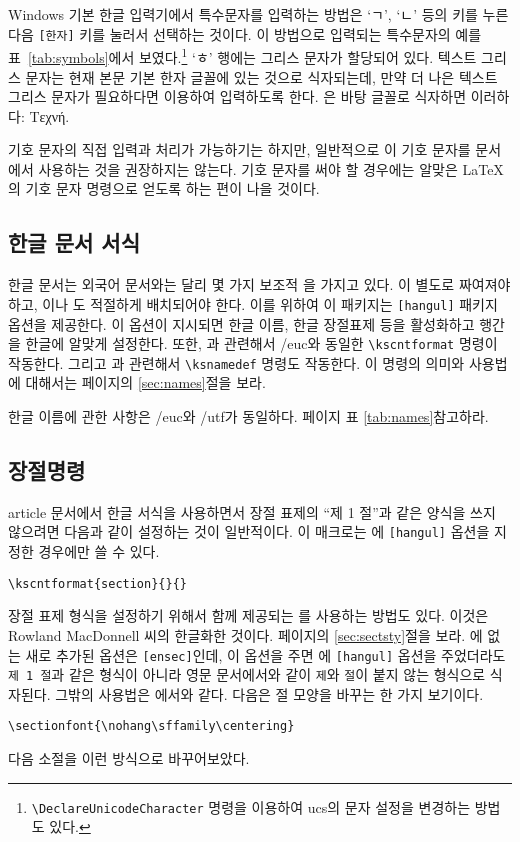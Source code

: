 Windows 기본 한글 입력기에서 특수문자를 입력하는 방법은 `ㄱ', `ㄴ' 등의 키를
누른 다음 \texttt{[한자]} 키를 눌러서 선택하는 것이다. 이 방법으로 입력되는
특수문자의 예를 표~\ref{tab:symbols}에서 보였다.\footnote{%
	\texttt{\textbackslash DeclareUnicodeCharacter} 명령을 이용하여
	ucs의 문자 설정을 변경하는 방법도 있다.}
`ㅎ' 행에는 그리스 문자가 할당되어 있다. 텍스트 그리스 문자는
현재 본문 기본 한자 글꼴에 있는 것으로 식자되는데, 만약 더 나은
텍스트 그리스 문자가 필요하다면 \을 이용하여 입력하도록 한다.	
은 바탕 글꼴로 식자하면 이러하다: Τεχνή.

기호 문자의 직접 입력과 처리가 가능하기는 하지만, 일반적으로
이 기호 문자를 문서에서 사용하는 것을 권장하지는 않는다.
기호 문자를 써야 할 경우에는 알맞은 \LaTeX 의 기호 문자 명령으로
얻도록 하는 편이 나을 것이다.

\subsection{한글 문서 서식}
한글 문서는 외국어 문서와는 달리 몇 가지 보조적 을
가지고 있다. 이 별도로 짜여져야 하고, 이나
도 적절하게 배치되어야 한다.
이를 위하여 이 패키지는 \verb|[hangul]| 패키지 옵션을 제공한다.
이 옵션이 지시되면 한글 이름, 한글 장절표제 등을 활성화하고
행간을 한글에 알맞게 설정한다. 
또한, 과 관련해서 \kotex/euc와 동일한 
\verb|\kscntformat| 명령이 작동한다.
그리고 과 관련해서 \verb|\ksnamedef| 명령도 작동한다.
이 명령의 의미와 사용법에 대해서는 \pageref{sec:names} 페이지의
\ref{sec:names}절을 보라.

한글 이름에 관한 사항은 \kotex/euc와 \kotex/utf가 동일하다.
\pageref{tab:names} 페이지 표 \ref{tab:names}\를 참고하라. 


\subsection{장절명령}
article 문서에서 한글 서식을 사용하면서 장절 표제의 ``제 1 절''과 같은 양식을 
쓰지 않으려면 다음과 같이 설정하는 것이 일반적이다. 이 매크로는 \thispkg 에
\texttt{[hangul]} 옵션을 지정한 경우에만 쓸 수 있다.
\begin{verbatim}
\kscntformat{section}{}{}
\end{verbatim}

장절 표제 형식을 설정하기 위해서
\thispkg\와 함께 제공되는 를 사용하는 방법도 있다.
이것은 Rowland MacDonnell 씨의
\를 한글화한 것이다. \pageref{sec:sectsty} 페이지의
\ref{sec:sectsty}절을 보라.
에 없는 새로 추가된
옵션은 \texttt{[ensec]}인데, 이 옵션을 주면 \thispkg 에 \texttt{[hangul]}
옵션을 주었더라도 \texttt{제 1 절}과 같은 형식이 아니라 영문 문서에서와
같이 \texttt{제}와 \texttt{절}이 붙지 않는 형식으로 식자된다.
그밖의 사용법은 에서와 같다. 다음은 절 모양을 바꾸는 한 가지
보기이다.
\begin{verbatim}
\sectionfont{\nohang\sffamily\centering}
\end{verbatim}
다음 소절을 이런 방식으로 바꾸어보았다.

